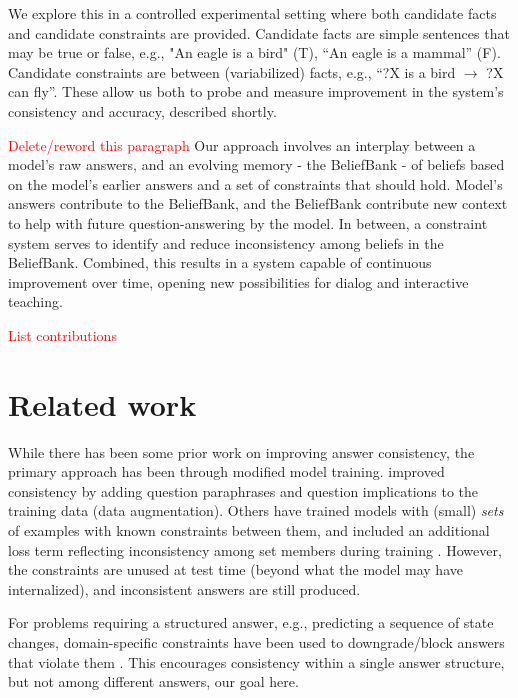 \documentclass[11pt]{article}
\newcommand{\red}[1]{\textcolor{red}{#1}}
\begin{document}
We explore this in a controlled experimental setting where 
both candidate facts and candidate constraints are provided. Candidate facts are simple
sentences that may be true or false, e.g., "An eagle is a bird" (T), ``An eagle is a mammal'' (F). Candidate constraints are between (variabilized) facts, e.g., ``?X is a bird $\rightarrow$ ?X can fly''. These allow us both to probe and measure improvement
in the system's consistency and accuracy, described shortly.

\red{Delete/reword this paragraph} Our approach involves an interplay between a model's raw answers, and an
evolving memory - the BeliefBank - of beliefs based on the model's earlier answers
and a set of constraints that should hold. Model's answers contribute to the BeliefBank,
and the BeliefBank contribute new context to help with future question-answering by
the model. In between, a constraint system serves to identify and reduce inconsistency
among beliefs in the BeliefBank. Combined, this results in a system capable of
continuous improvement over time, opening new possibilities for dialog and
interactive teaching.

\red{List contributions}

\section{Related work}

While there has been some prior work on improving answer consistency, the primary approach
has been through modified model training. \citet{Ribeiro2019AreRR} improved consistency
by adding question paraphrases and question implications to the training data (data augmentation).
Others have trained models with (small) {\it sets} of examples with known constraints
between them, and included an additional loss term reflecting inconsistency among
set members during training \cite{Minervini2018AdversariallyRN,Li2019ALF,Asai2020LogicGuidedDA}.
However, the constraints are unused at test time (beyond what the model may have
internalized), and inconsistent answers are still produced.

For problems requiring a structured answer, e.g., predicting a sequence of
state changes, domain-specific constraints have been used to downgrade/block
answers that violate them \cite{Tandon2018ReasoningAA,Du2019BeCI}. This
encourages consistency within a single answer structure, but not among
different answers, our goal here.
\end{document}
